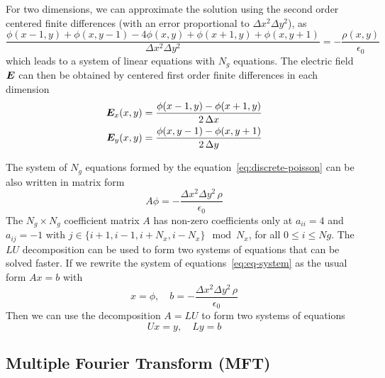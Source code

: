 %
For two dimensions, we can approximate the solution using the second order 
centered finite differences (with an error proportional to $\Delta x ^2 \Delta 
y^2$), as
%
\begin{equation}%
\label{eq:discrete-poisson}
\frac{\phi(x-1, y) + \phi(x, y-1) - 4\phi(x,y) + \phi(x+1,y)+\phi(x,y+1)}{\Delta 
x ^2 \Delta y^2} = - \frac{\rho(x,y)}{\epsilon_0}
\end{equation}%
%
which leads to a system of linear equations with $N_g$ equations.
The electric field $\bm{E}$ can then be obtained by centered first order finite 
differences in each dimension
%
\begin{equation}%
\begin{split}
\label{eq:phi-to-E}
\E_x(x,y) &= \frac{\phi(x-1,y) - \phi(x+1,y)}{2\,\Delta x} \\
\E_y(x,y) &= \frac{\phi(x,y-1) - \phi(x,y+1)}{2\,\Delta y}
\end{split}
\end{equation}%
%



The system of $N_g$ equations formed by the equation~\ref{eq:discrete-poisson} 
can be also written in matrix form
%
\begin{equation}
\label{eq:eq-system}
A\phi = -\frac{\Delta x ^2 \Delta y^2\,\rho}{\epsilon_0}
\end{equation}
%
The $N_g \times N_g$ coefficient matrix $A$ has non-zero coefficients only at 
$a_{ii} = 4$ and $a_{ij} = -1$ with $j \in \{i+1, i-1, i+N_x, i-N_x\} \mod N_x$, 
for all $0 \le i \le Ng$.
%
The $LU$ decomposition can be used to form two systems of equations that can be 
solved faster. If we rewrite the system of equations~\ref{eq:eq-system} as the 
usual form $Ax=b$ with
\begin{equation}
x = \phi,\quad b = -\frac{\Delta x ^2 \Delta y^2\,\rho}{\epsilon_0}
\end{equation}
%
Then we can use the decomposition $A=LU$ to form two systems of equations
%
\begin{equation}
Ux=y, \quad Ly=b
\end{equation}



\subsection{Multiple Fourier Transform (MFT)}

